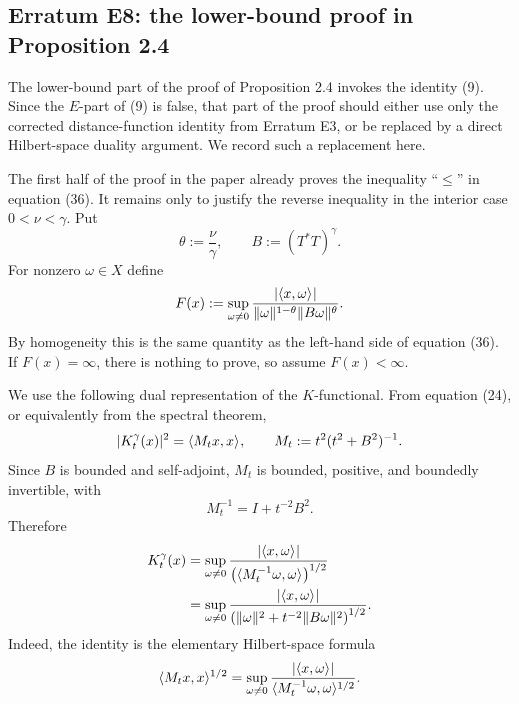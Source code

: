 
\subsection*{Erratum E8: the lower-bound proof in Proposition 2.4}
\label{s:erratum:E8}

The lower-bound part of the proof of Proposition 2.4 invokes the
identity (9).  Since the $E$-part of (9) is false, that
part of the proof should either use only the corrected distance-function
identity from Erratum E3, or be replaced by a direct Hilbert-space duality
argument.  We record such a replacement here.

The first half of the proof in the paper already proves the inequality
``$\leq$'' in equation (36).  It remains only to justify the reverse
inequality in the interior case $0<\nu<\gamma$.  Put
\[
        \theta:=\frac{\nu}{\gamma},
        \qquad
        B:=(T^*T)^\gamma .
\]
For nonzero $\omega\in X$ define
\[
        F(x)
        :=
        \sup_{\omega\neq0}
        \frac{|\langle x,\omega \rangle_{  }|}
             {\| \omega \|_{  }^{1-\theta}\| B\omega \|_{  }^\theta} .
\]
By homogeneity this is the same quantity as the left-hand side of
equation (36).  If $F(x)=\infty$, there is nothing to prove, so assume
$F(x)<\infty$.

We use the following dual representation of the $K$-functional.  From
equation (24), or equivalently from the spectral theorem,
\[
        |K_t^\gamma(x)|^2
        =
        \langle M_t x,x \rangle_{  },
        \qquad
        M_t:=t^2(t^2+B^2)^{-1}.
\]
Since $B$ is bounded and self-adjoint, $M_t$ is bounded, positive, and
boundedly invertible, with
\[
        M_t^{-1}=I+t^{-2}B^2.
\]
Therefore
\begin{align}
        K_t^\gamma(x)
        &=
        \sup_{\omega\neq0}
        \frac{|\langle x,\omega \rangle_{  }|}
             {\bigl(\langle M_t^{-1}\omega,\omega \rangle_{  }\bigr)^{1/2}}        
        \notag\\
        &=
        \sup_{\omega\neq0}
        \frac{|\langle x,\omega \rangle_{  }|}
             {\left(\| \omega \|_{  }^2+t^{-2}\| B\omega \|_{  }^2\right)^{1/2}} .
        \label{e:erratum:E8:dual-K}
\end{align}
Indeed, the identity is the elementary Hilbert-space formula
\[
        \langle M_t x,x \rangle_{  }^{1/2}
        =
        \sup_{\omega\neq0}
        \frac{|\langle x,\omega \rangle_{  }|}
             {\langle M_t^{-1}\omega,\omega \rangle_{  }^{1/2}} .
\]

